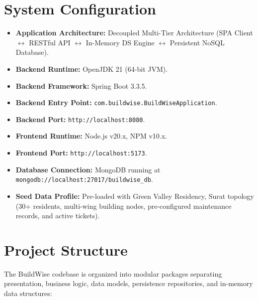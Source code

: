 \documentclass[12pt,a4paper]{article}
\begin{document}
\section{System Configuration}

\begin{itemize}[leftmargin=1.5em]
    \item \textbf{Application Architecture:} Decoupled Multi-Tier Architecture (SPA Client $\leftrightarrow$ RESTful API $\leftrightarrow$ In-Memory DS Engine $\leftrightarrow$ Persistent NoSQL Database).
    \item \textbf{Backend Runtime:} OpenJDK 21 (64-bit JVM).
    \item \textbf{Backend Framework:} Spring Boot 3.3.5.
    \item \textbf{Backend Entry Point:} \texttt{com.buildwise.BuildWiseApplication}.
    \item \textbf{Backend Port:} \texttt{http://localhost:8080}.
    \item \textbf{Frontend Runtime:} Node.js v20.x, NPM v10.x.
    \item \textbf{Frontend Port:} \texttt{http://localhost:5173}.
    \item \textbf{Database Connection:} MongoDB running at \texttt{mongodb://localhost:27017/buildwise\_db}.
    \item \textbf{Seed Data Profile:} Pre-loaded with Green Valley Residency, Surat topology (30+ residents, multi-wing building nodes, pre-configured maintenance records, and active tickets).
\end{itemize}

\section{Project Structure}

The BuildWise codebase is organized into modular packages separating presentation, business logic, data models, persistence repositories, and in-memory data structures:
\end{document}
